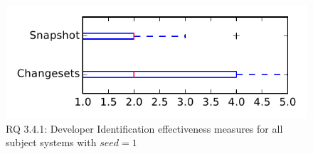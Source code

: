 
\begin{figure}
\centering
\includegraphics[height=0.4\textheight]{figures/dit_seed/rq1_tiny_1}
\caption{RQ 3.4.1: Developer Identification effectiveness measures for all subject systems with $seed=1$}
\label{fig:dit_seed:rq1:tiny}
\end{figure}
